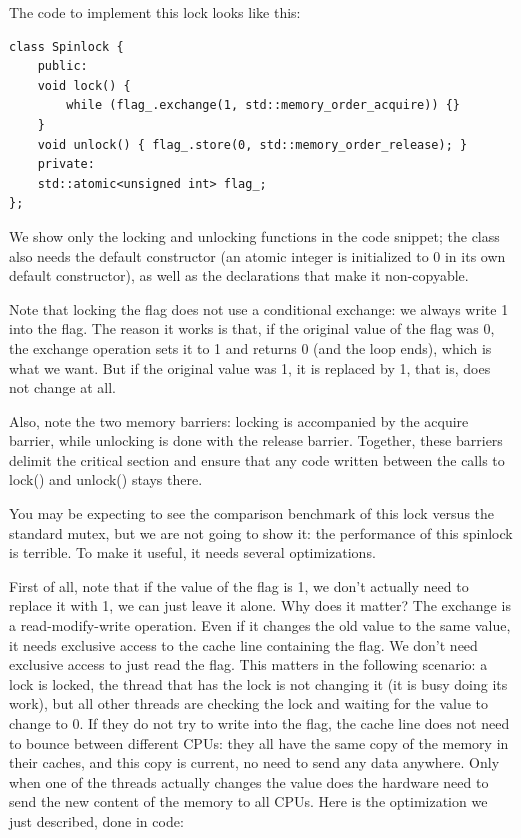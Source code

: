 The code to implement this lock looks like this:

\begin{lstlisting}[style=styleCXX]
class Spinlock {
	public:
	void lock() {
		while (flag_.exchange(1, std::memory_order_acquire)) {}
	}
	void unlock() { flag_.store(0, std::memory_order_release); }
	private:
	std::atomic<unsigned int> flag_;
};
\end{lstlisting}

We show only the locking and unlocking functions in the code snippet; the class also needs the default constructor (an atomic integer is initialized to 0 in its own default constructor), as well as the declarations that make it non-copyable.

Note that locking the flag does not use a conditional exchange: we always write 1 into the flag. The reason it works is that, if the original value of the flag was 0, the exchange operation sets it to 1 and returns 0 (and the loop ends), which is what we want. But if the original value was 1, it is replaced by 1, that is, does not change at all.

Also, note the two memory barriers: locking is accompanied by the acquire barrier, while unlocking is done with the release barrier. Together, these barriers delimit the critical section and ensure that any code written between the calls to lock() and unlock() stays there.

You may be expecting to see the comparison benchmark of this lock versus the standard mutex, but we are not going to show it: the performance of this spinlock is terrible. To make it useful, it needs several optimizations.

First of all, note that if the value of the flag is 1, we don't actually need to replace it with 1, we can just leave it alone. Why does it matter? The exchange is a read-modify-write operation. Even if it changes the old value to the same value, it needs exclusive access to the cache line containing the flag. We don't need exclusive access to just read the flag. This matters in the following scenario: a lock is locked, the thread that has the lock is not changing it (it is busy doing its work), but all other threads are checking the lock and waiting for the value to change to 0. If they do not try to write into the flag, the cache line does not need to bounce between different CPUs: they all have the same copy of the memory in their caches, and this copy is current, no need to send any data anywhere. Only when one of the threads actually changes the value does the hardware need to send the new content of the memory to all CPUs. Here is the optimization we just described, done in code:

